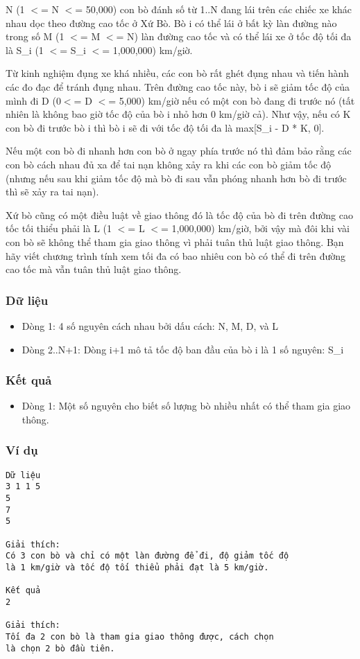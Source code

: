 



   N (1 $<$= N $<$= 50,000) con bò đánh số từ 1..N đang lái trên các  chiếc xe khác nhau dọc theo đường cao tốc ở Xứ Bò. Bò i có thể  lái ở bất kỳ làn đường nào trong số M (1 $<$= M $<$= N) làn đường cao  tốc và có thể lái xe ở tốc độ tối đa là S\_i (1 $<$= S\_i $<$= 1,000,000) km/giờ.  

   Từ kinh nghiệm đụng xe khá nhiều, các con bò rất ghét đụng nhau  và tiến hành các đo đạc để tránh đụng nhau. Trên đường cao tốc này, bò  i sẽ giảm tốc độ của mình đi D (0$<$= D $<$= 5,000) km/giờ nếu có  một con bò đang đi trước nó (tất nhiên là không bao giờ tốc độ của  bò i nhỏ hơn 0 km/giờ cả). Như vậy, nếu có K con bò đi trước bò i  thì bò i sẽ đi với tốc độ tối đa là max[S\_i - D * K, 0].  

   Nếu một  con bò đi nhanh hơn con bò ở ngay phía trước nó thì đảm bảo  rằng các con bò cách nhau đủ xa để tai nạn không xảy ra khi các con  bò giảm tốc độ (nhưng nếu sau khi giảm tốc độ mà bò đi sau vẫn  phóng nhanh hơn bò đi trước thì sẽ xảy ra tai nạn).  

   Xứ bò cũng có một điều luật về giao thông đó là tốc độ của bò  đi trên đường cao tốc tối thiểu phải là L (1 $<$= L $<$= 1,000,000) km/giờ, bởi  vậy mà đôi khi vài con bò sẽ không thể tham gia giao thông vì  phải tuân thủ luật giao thông. Bạn hãy viết chương trình  tính xem tối đa có bao nhiêu con bò có thể đi trên đường cao tốc mà vẫn  tuân thủ luật giao thông.  

\subsubsection{   Dữ liệu  }
\begin{itemize}
	\item     Dòng 1: 4 số nguyên cách nhau bởi dấu cách: N, M, D, và L   
	\item     Dòng 2..N+1: Dòng i+1 mô tả tốc độ ban đầu của bò i là 1 số nguyên: S\_i   
\end{itemize}

\subsubsection{   Kết quả  }
\begin{itemize}
	\item     Dòng 1: Một số nguyên cho biết số lượng bò nhiều nhất có thể            tham gia giao thông.   
\end{itemize}

\subsubsection{   Ví dụ  }
\begin{verbatim}
Dữ liệu
3 1 1 5
5
7
5

Giải thích:
Có 3 con bò và chỉ có một làn đường để đi, độ giảm tốc độ 
là 1 km/giờ và tốc độ tối thiểu phải đạt là 5 km/giờ.

Kết quả
2

Giải thích:
Tối đa 2 con bò là tham gia giao thông được, cách chọn 
là chọn 2 bò đầu tiên.
\end{verbatim}